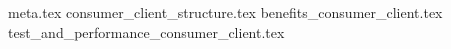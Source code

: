 {meta.tex}
{consumer_client_structure.tex}
{benefits_consumer_client.tex}
{test_and_performance_consumer_client.tex}
